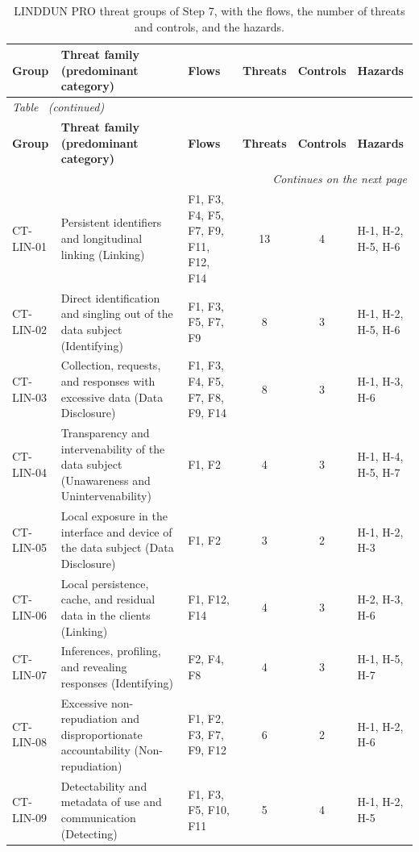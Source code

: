 \begin{longtable}{l p{} p{} c c p{}}
    \caption[LINDDUN PRO threat groups of Step 7]{LINDDUN PRO threat groups of Step 7, with the flows, the number of threats and controls, and the hazards.}
    \label{tab:apxC_grupos} \\
    \hline
    \textbf{Group} & \textbf{Threat family (predominant category)} & \textbf{Flows} & \textbf{Threats} & \textbf{Controls} & \textbf{Hazards} \\
    \hline
    \endfirsthead
    \multicolumn{6}{l}{\small\emph{Table~\thetable{} (continued)}} \\
    \hline
    \textbf{Group} & \textbf{Threat family (predominant category)} & \textbf{Flows} & \textbf{Threats} & \textbf{Controls} & \textbf{Hazards} \\
    \hline
    \endhead
    \hline
    \multicolumn{6}{r}{\small\emph{Continues on the next page}} \\
    \endfoot
    \hline
    \endlastfoot
        CT-LIN-01 & Persistent identifiers and longitudinal linking (Linking) & F1, F3, F4, F5, F7, F9, F11, F12, F14 & 13 & 4 & H-1, H-2, H-5, H-6 \\[0.4em]
        CT-LIN-02 & Direct identification and singling out of the data subject (Identifying) & F1, F3, F5, F7, F9 & 8 & 3 & H-1, H-2, H-5, H-6 \\[0.4em]
        CT-LIN-03 & Collection, requests, and responses with excessive data (Data Disclosure) & F1, F3, F4, F5, F7, F8, F9, F14 & 8 & 3 & H-1, H-3, H-6 \\[0.4em]
        CT-LIN-04 & Transparency and intervenability of the data subject (Unawareness and Unintervenability) & F1, F2 & 4 & 3 & H-1, H-4, H-5, H-7 \\[0.4em]
        CT-LIN-05 & Local exposure in the interface and device of the data subject (Data Disclosure) & F1, F2 & 3 & 2 & H-1, H-2, H-3 \\[0.4em]
        CT-LIN-06 & Local persistence, cache, and residual data in the clients (Linking) & F1, F12, F14 & 4 & 3 & H-2, H-3, H-6 \\[0.4em]
        CT-LIN-07 & Inferences, profiling, and revealing responses (Identifying) & F2, F4, F8 & 4 & 3 & H-1, H-5, H-7 \\[0.4em]
        CT-LIN-08 & Excessive non-repudiation and disproportionate accountability (Non-repudiation) & F1, F2, F3, F7, F9, F12 & 6 & 2 & H-1, H-2, H-6 \\[0.4em]
        CT-LIN-09 & Detectability and metadata of use and communication (Detecting) & F1, F3, F5, F10, F11 & 5 & 4 & H-1, H-2, H-5 \\[0.4em]

\end{longtable}

